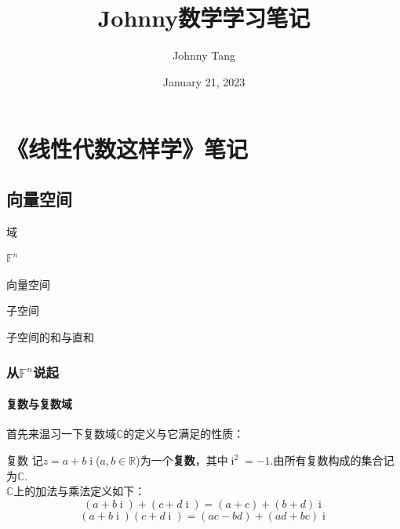 \documentclass[lang=cn, zihao=5]{elegantbook}
\title{Johnny数学学习笔记}
\subtitle
\author{Johnny Tang}
\institute{DEEP Team}
\date{January 21, 2023}
\newcommand{\R}{\mathbb{R}}
\newcommand{\C}{\mathbb{C}}
\newcommand{\F}{\mathbb{F}}
\DeclareMathOperator{\ic}{i}
\begin{document}
\maketitle

\frontmatter

\mainmatter

\tableofcontents

\part{《线性代数这样学》笔记}

\chapter{向量空间}
\begin{introduction}
	\item 域
	\item $\F ^{n}$
	\item 向量空间
	\item 子空间
	\item 子空间的和与直和
\end{introduction}

\section{从$\F ^{n}$说起}

\subsection{复数与复数域}

首先来温习一下复数域$\C$的定义与它满足的性质：

\begin{definition}{复数}
	记$z=a+b\ic $($a,b \in \R$)为一个\textbf{复数}，其中$\ic ^2=-1$.由所有复数构成的集合记为$\C$. \\
	$\C$上的加法与乘法定义如下：
	$$(a+b\ic ) + (c+d\ic ) = (a+c) + (b+d)\ic $$
	$$(a+b\ic )(c+d\ic ) = (ac-bd) + (ad+bc)\ic $$
\end{definition}
\end{document}
